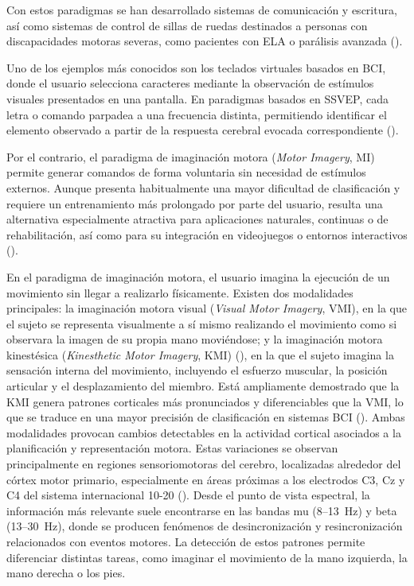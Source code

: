 Con estos paradigmas se han desarrollado sistemas de comunicación y escritura, así como sistemas de control de sillas de ruedas destinados a personas con discapacidades motoras severas, como pacientes con ELA o parálisis avanzada (\cite{guger2009p300}).

Uno de los ejemplos más conocidos son los teclados virtuales basados en BCI, donde el usuario selecciona caracteres mediante la observación de estímulos visuales presentados en una pantalla. En paradigmas basados en SSVEP, cada letra o comando parpadea a una frecuencia distinta, permitiendo identificar el elemento observado a partir de la respuesta cerebral evocada correspondiente (\cite{chen2015high}). 

Por el contrario, el paradigma de imaginación motora (\textit{Motor Imagery}, MI) permite generar comandos de forma voluntaria sin necesidad de estímulos externos. Aunque presenta habitualmente una mayor dificultad de clasificación y requiere un entrenamiento más prolongado por parte del usuario, resulta una alternativa especialmente atractiva para aplicaciones naturales, continuas o de rehabilitación, así como para su integración en videojuegos o entornos interactivos (\cite{pfurtscheller2001motor}).

En el paradigma de imaginación motora, el usuario imagina la ejecución de un movimiento sin llegar a realizarlo físicamente. Existen dos modalidades principales: la imaginación motora visual (\textit{Visual Motor Imagery}, VMI), en la que el sujeto se representa visualmente a sí mismo realizando el movimiento como si observara la imagen de su propia mano moviéndose; y la imaginación motora kinestésica (\textit{Kinesthetic Motor Imagery}, KMI) (\cite{neuper2006motor}), en la que el sujeto imagina la sensación interna del movimiento, incluyendo el esfuerzo muscular, la posición articular y el desplazamiento del miembro. Está ampliamente demostrado que la KMI genera patrones corticales más pronunciados y diferenciables que la VMI, lo que se traduce en una mayor precisión de clasificación en sistemas BCI (\cite{wriessnegger2018frequency}). Ambas modalidades provocan cambios detectables en la actividad cortical asociados a la planificación y representación motora. Estas variaciones se observan principalmente en regiones sensoriomotoras del cerebro, localizadas alrededor del córtex motor primario, especialmente en áreas próximas a los electrodos C3, Cz y C4 del sistema internacional 10-20 (\cite{klem1999ten}). Desde el punto de vista espectral, la información más relevante suele encontrarse en las bandas mu (8–13~Hz) y beta (13–30~Hz), donde se producen fenómenos de desincronización y resincronización relacionados con eventos motores. La detección de estos patrones permite diferenciar distintas tareas, como imaginar el movimiento de la mano izquierda, la mano derecha o los pies.

